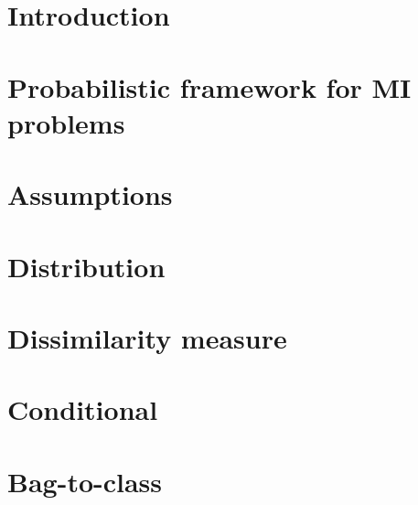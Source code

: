 \documentclass[preprint,12pt]{elsarticle}
\begin{document}
\newcommand{\cpos}{\text{\scriptsize{{\it POS}}}}
\newcommand{\cneg}{\text{\scriptsize{{\it NEG}}}}


\begin{frontmatter}







\end{frontmatter}

\clearpage

\section{Introduction} \label{sec:Introduction} 


\section{Probabilistic framework for MI problems} \label{sec:Probabilistic} 


% 

\section{Assumptions} \label{sec:Assumptions}


\section{Distribution} \label{sec:Distribution}


\section{Dissimilarity measure} \label{sec:Dissimilarity}


\section{Conditional} \label{sec:Conditional}


\section{Bag-to-class} \label{sec:Bag_vs_Class}

\end{document}
